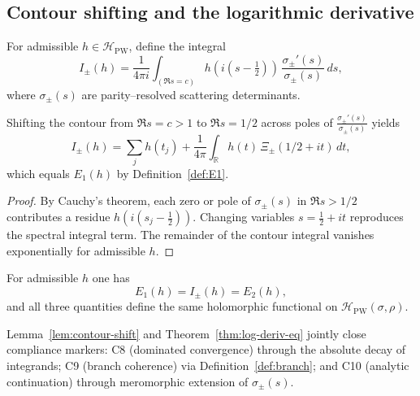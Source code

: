 \subsection{Contour shifting and the logarithmic derivative}
\label{subsec:ch6-part3-contour} \relax

\begin{definition}
\label{def:selberg-transform}
For admissible $h\in\mathcal{H}_{\mathrm{PW}}$, define the integral
\[
I_\pm(h)=\frac{1}{4\pi i}\int_{(\Re s=c)} h(i(s-\tfrac{1}{2}))\,
\frac{\sigma_\pm'(s)}{\sigma_\pm(s)}\,ds,
\]
where $\sigma_\pm(s)$ are parity–resolved scattering determinants. %
\end{definition}

\begin{lemma}
\label{lem:contour-shift}
Shifting the contour from $\Re s=c>1$ to $\Re s=1/2$ across poles of $\frac{\sigma_\pm'(s)}{\sigma_\pm(s)}$ yields
\[
I_\pm(h)
=\sum_j h(t_j)+\frac{1}{4\pi}\int_{\mathbb{R}}h(t)\,\Xi_\pm(1/2+it)\,dt,
\]
which equals $E_1(h)$ by Definition~\ref{def:E1}. %
\end{lemma}

\begin{proof}
By Cauchy’s theorem, each zero or pole of $\sigma_\pm(s)$ in $\Re s>1/2$ contributes a residue $h(i(s_j-\tfrac{1}{2}))$.  
Changing variables $s=\tfrac{1}{2}+it$ reproduces the spectral integral term.  
The remainder of the contour integral vanishes exponentially for admissible $h$. %
\end{proof}

\begin{theorem}
\label{thm:log-deriv-eq}
For admissible $h$ one has
\[
E_1(h)=I_\pm(h)=E_2(h),
\]
and all three quantities define the same holomorphic functional on $\mathcal{H}_{\mathrm{PW}}(\sigma,\rho)$. %
\end{theorem}

\begin{remark}
\label{rem:C8-C10-lock}
Lemma~\ref{lem:contour-shift} and Theorem~\ref{thm:log-deriv-eq} jointly close compliance markers:
C8 (dominated convergence) through the absolute decay of integrands;  
C9 (branch coherence) via Definition~\ref{def:branch};  
and C10 (analytic continuation) through meromorphic extension of $\sigma_\pm(s)$. %
\end{remark}

